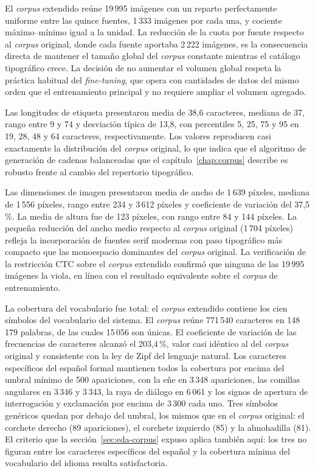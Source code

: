 El \textit{corpus} extendido reúne 19\,995 imágenes con un reparto perfectamente uniforme entre las quince fuentes, 1\,333 imágenes por cada una, y cociente máximo--mínimo igual a la unidad. La reducción de la cuota por fuente respecto al \textit{corpus} original, donde cada fuente aportaba 2\,222 imágenes, es la consecuencia directa de mantener el tamaño global del \textit{corpus} constante mientras el catálogo tipográfico crece. La decisión de no aumentar el volumen global respeta la práctica habitual del \textit{fine-tuning}, que opera con cantidades de datos del mismo orden que el entrenamiento principal y no requiere ampliar el volumen agregado.

Las longitudes de etiqueta presentaron media de 38,6 caracteres, mediana de 37, rango entre 9 y 74 y desviación típica de 13,8, con percentiles 5, 25, 75 y 95 en 19, 28, 48 y 64 caracteres, respectivamente. Los valores reproducen casi exactamente la distribución del \textit{corpus} original, lo que indica que el algoritmo de generación de cadenas balanceadas que el capítulo~\ref{chap:corpus} describe es robusto frente al cambio del repertorio tipográfico.

Las dimensiones de imagen presentaron media de ancho de 1\,639 píxeles, mediana de 1\,556 píxeles, rango entre 234 y 3\,612 píxeles y coeficiente de variación del 37,5\,\%. La media de altura fue de 123 píxeles, con rango entre 84 y 144 píxeles. La pequeña reducción del ancho medio respecto al \textit{corpus} original (1\,704 píxeles) refleja la incorporación de fuentes serif modernas con paso tipográfico más compacto que las monoespacio dominantes del \textit{corpus} original. La verificación de la restricción CTC sobre el \textit{corpus} extendido confirmó que ninguna de las 19\,995 imágenes la viola, en línea con el resultado equivalente sobre el \textit{corpus} de entrenamiento.

La cobertura del vocabulario fue total: el \textit{corpus} extendido contiene los cien símbolos del vocabulario del sistema. El \textit{corpus} reúne 771\,540 caracteres en 148\,179 palabras, de las cuales 15\,056 son únicas. El coeficiente de variación de las frecuencias de caracteres alcanzó el 203,4\,\%, valor casi idéntico al del \textit{corpus} original y consistente con la ley de Zipf del lenguaje natural. Los caracteres específicos del español formal mantienen todos la cobertura por encima del umbral mínimo de 500 apariciones, con la eñe en 3\,348 apariciones, las comillas angulares en 3\,346 y 3\,343, la raya de diálogo en 6\,061 y los signos de apertura de interrogación y exclamación por encima de 3\,300 cada uno. Tres símbolos genéricos quedan por debajo del umbral, los mismos que en el \textit{corpus} original: el corchete derecho (89 apariciones), el corchete izquierdo (85) y la almohadilla (81). El criterio que la sección~\ref{sec:eda-corpus} expuso aplica también aquí: los tres no figuran entre los caracteres específicos del español y la cobertura mínima del vocabulario del idioma resulta satisfactoria.

